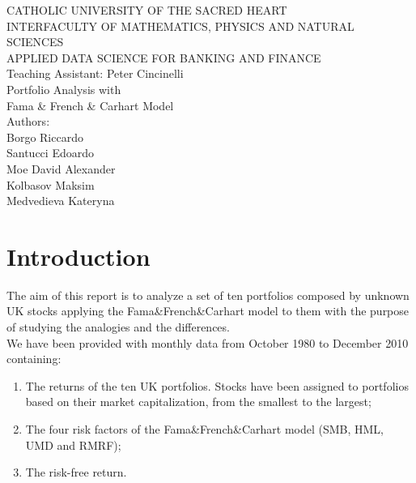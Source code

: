 \documentclass[11pt]{article}
\begin{document}
\onehalfspacing

\begin{center}
\MakeUppercase{Catholic University of the Sacred Heart\\
Interfaculty of Mathematics, Physics and Natural Sciences\\
Applied Data Science for Banking and Finance}\\
\vspace{1cm}
Teaching Assistant: Peter Cincinelli \\
\vspace{24pt}
\huge Portfolio Analysis with \\ Fama \& French \& Carhart Model\\
\vspace{144pt}
\LARGE Authors: \\ 
\large Borgo Riccardo\\
Santucci Edoardo\\
Moe David Alexander \\
Kolbasov Maksim\\
Medvedieva Kateryna\\
\end{center}

\clearpage
\tableofcontents
\clearpage
\listoffigures
\clearpage
\listoftables
\clearpage


\section{Introduction}

The aim of this report is to analyze a set of ten portfolios composed by unknown UK stocks applying the Fama\&French\&Carhart model to them with the purpose of studying the 
analogies and the differences.\\
We have been provided with monthly data from October 1980 to December 2010 containing:
\begin{enumerate}
    \item The returns of the ten UK portfolios. Stocks have been assigned to portfolios based on their market capitalization, from the smallest to the largest;
    \item The four risk factors of the Fama\&French\&Carhart model (SMB, HML, UMD and RMRF);
    \item The risk-free return.
\end{enumerate}
\end{document}
